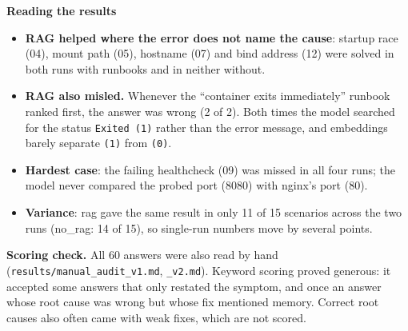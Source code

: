 \documentclass[10pt,a4paper]{article}
\newcommand{\cmark}{\textcolor{green!45!black}{\ding{51}}}
\newcommand{\xmark}{\textcolor{red!70!black}{\ding{55}}}
\newcommand{\code}[1]{\texttt{#1}}
\begin{document}
\begin{table}[H]
\centering\small
\SummaryTable
\caption{Results measured by \code{eval.py}. ``Steps'' counts model calls.}
\end{table}

\begin{table}[H]
\centering\small
\begin{minipage}[t]{0.47\textwidth}\centering\vspace{0pt}
\PerScenarioTable
\end{minipage}\hfill
\begin{minipage}[t]{0.49\textwidth}\vspace{0pt}
\small
\textbf{Reading the results}
\begin{itemize}
\item \textbf{RAG helped where the error does not name the cause}: startup race (04), mount path (05),
  hostname (07) and bind address (12) were solved in both runs with runbooks and in neither without.
\item \textbf{RAG also misled.} Whenever the ``container exits immediately'' runbook ranked first, the
  answer was wrong (2 of 2). Both times the model searched for the status \code{Exited (1)} rather than
  the error message, and embeddings barely separate \code{(1)} from \code{(0)}.
\item \textbf{Hardest case}: the failing healthcheck (09) was missed in all four runs; the model never
  compared the probed port (8080) with nginx's port (80).
\item \textbf{Variance}: rag gave the same result in only 11 of 15 scenarios across the two runs
  (no\_rag: 14 of 15), so single-run numbers move by several points.
\end{itemize}
\end{minipage}
\caption{Per-scenario outcome in both runs (\cmark{} correct, \xmark{} wrong).}
\end{table}

\textbf{Scoring check.} All 60 answers were also read by hand
(\code{results/manual\_audit\_v1.md}, \code{\_v2.md}). Keyword scoring proved generous: it accepted
some answers that only restated the symptom, and once an answer whose root cause was wrong but whose
fix mentioned memory. Correct root causes also often came with weak fixes, which are not scored.

\end{document}
